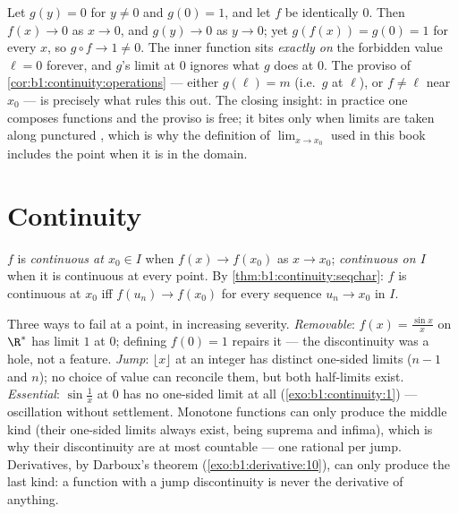 \begin{example}\label{ex:b1:continuity:compositiontrap}
Let $g(y) = 0$ for $y \neq 0$ and $g(0) = 1$, and let $f$ be
identically $0$. Then $f(x) \to 0$ as $x \to 0$, and $g(y) \to 0$
as $y \to 0$; yet $g(f(x)) = g(0) = 1$ for every $x$, so $g
\circ f \to 1 \neq 0$. The inner function sits \emph{exactly on}
the forbidden value $\ell = 0$ forever, and $g$'s limit at $0$
ignores what $g$ does at $0$. The proviso of
\cref{cor:b1:continuity:operations} --- either $g(\ell) = m$
(i.e.\ $g$  at $\ell$), or $f \neq \ell$ near $x_0$ ---
is precisely what rules this out. The closing insight: in
practice one composes \emph{} functions and the
proviso is free; it bites only when limits are taken along
punctured , which is why the definition of
$\lim_{x \to x_0}$ used in this book includes the point when it
is in the domain.
\end{example}

\section{Continuity}

\begin{definition}\label{def:b1:continuity:continuous}
$f$ is \emph{continuous at $x_0 \in I$} when $f(x)
\to f(x_0)$ as $x \to x_0$; \emph{continuous on $I$} when it is
continuous at every point. By
\cref{thm:b1:continuity:seqchar}: $f$ is continuous at $x_0$ iff
$f(u_n) \to f(x_0)$ for every sequence $u_n \to x_0$ in $I$.
\end{definition}

\begin{example}\label{ex:b1:continuity:taxonomy}
Three ways to fail at a point, in increasing severity.
\emph{Removable}: $f(x) = \frac{\sin x}{x}$ on $\R^*$ has limit
$1$ at $0$; defining $f(0) = 1$ repairs it --- the discontinuity
was a hole, not a feature. \emph{Jump}: $\lfloor x \rfloor$ at
an integer has distinct one-sided limits ($n - 1$ and $n$); no
choice of value can reconcile them, but both half-limits exist.
\emph{Essential}: $\sin\frac1x$ at $0$ has no one-sided limit at
all (\cref{exo:b1:continuity:1}) --- oscillation without
settlement. Monotone functions can only produce the middle kind
(their one-sided limits always exist, being suprema and infima),
which is why their discontinuity  are at most countable ---
one rational per jump. Derivatives, by Darboux's theorem
(\cref{exo:b1:derivative:10}), can only produce the last kind:
a function with a jump discontinuity is never the derivative of
anything.
\end{example}

